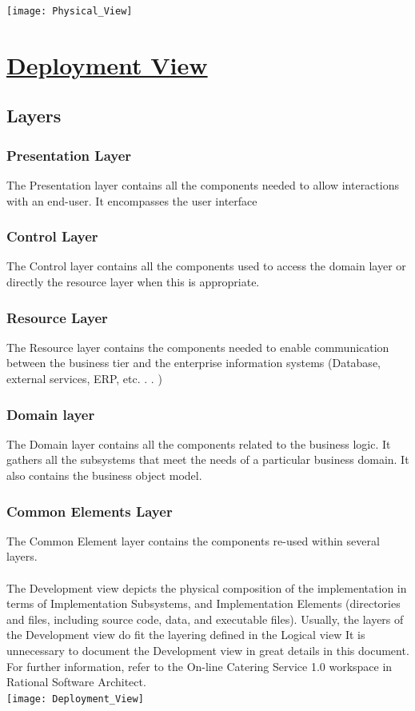 \documentclass{article}
\begin{document}
\texttt{[image: Physical\_View]}

\section{\underline{Deployment View }}
\subsection{Layers} 
\subsubsection{Presentation Layer}
The Presentation layer contains all the components needed to allow interactions
with an end-user. It encompasses the user interface
\subsubsection{Control Layer}
The Control layer contains all the components used to access the domain layer
or directly the resource layer when this is appropriate.
\subsubsection{Resource Layer}
The Resource layer contains the components needed to enable communication
between the business tier and the enterprise information systems (Database,
external services, ERP, etc. . . )
\subsubsection{Domain layer}
The Domain layer contains all the components related to the business logic. It
gathers all the subsystems that meet the needs of a particular business domain.
It also contains the business object model.

\subsubsection{Common Elements Layer}
The Common Element layer contains the components re-used within several
layers.\\\\
The Development view depicts the physical composition of the implementation
in terms of Implementation Subsystems, and Implementation Elements (directories and files, including source code, data, and executable files). Usually, the
layers of the Development view do fit the layering defined in the Logical view
It is unnecessary to document the Development view in great details in this
document. For further information, refer to the On-line Catering Service 1.0
workspace in Rational Software Architect.\\

\texttt{[image: Deployment\_View]}
\end{document}
